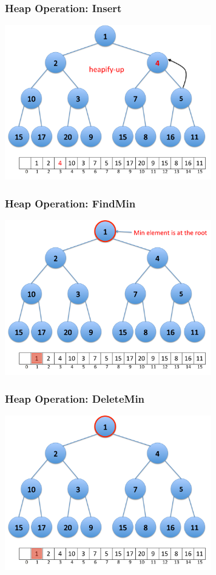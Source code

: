 \documentclass{beamer}
\begin{document}
\begin{frame}[containsverbatim]
\frametitle{Heap Operation: Insert}

\begin{center}
\includegraphics[width=9cm]{heap_insert4.pdf}%
\end{center}

\end{frame}

\begin{frame}[containsverbatim]
\frametitle{Heap Operation: FindMin}

\begin{center}
\includegraphics[width=9cm]{heap_find_min.pdf}%
\end{center}

\end{frame}

\begin{frame}[containsverbatim]
\frametitle{Heap Operation: DeleteMin}

\begin{center}
\includegraphics[width=9cm]{heap_delete_min1.pdf}%
\end{center}

\end{frame}
\end{document}
